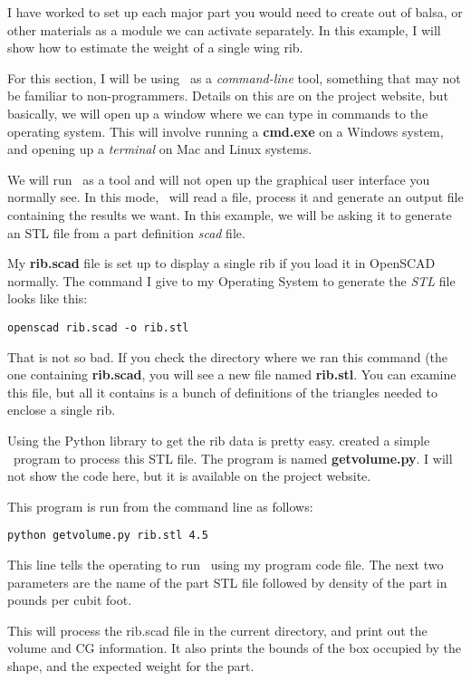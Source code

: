 I have worked to set up each major part you would need to create out of balsa,
or other materials as a module we can activate separately. In this example, I
will show how to estimate the weight of a single wing rib.

For this section, I will be using \osc\ as a {\it command-line} tool,
something that may not be familiar to non-programmers. Details on this are on
the project website, but basically, we will open up a window where we can type
in commands to the operating system. This will involve running a {\bf cmd.exe}
on a Windows system, and opening up a {\it terminal} on Mac and Linux systems.

We will run \osc\ as a tool and will not open up the graphical user
interface you normally see. In this mode, \osc\ will read a file, process it
and generate an output file containing the results we want. In this example, we
will be asking it to generate an STL file from a part definition {\it scad}
file.

My {\bf rib.scad} file is set up to display a single rib if you load it in
OpenSCAD normally. The command I give to my Operating System to generate the
{\it STL} file looks like this:

\begin{lstlisting}
openscad rib.scad -o rib.stl
\end{lstlisting}

That is not so bad. If you check the directory where we ran this command (the
one containing {\bf rib.scad}, you will see a new file named {\bf rib.stl}. You
can examine this file, but all it contains is a bunch of definitions of the
triangles needed to enclose a single rib.

Using the Python library to get the rib data is pretty easy.  created a simple
\PY\ program to process this STL file. The program is named {\bf getvolume.py}.
I will not show the code here, but it is available on the project website.

This program is run from the command line as follows:

\begin{lstlisting}
python getvolume.py rib.stl 4.5
\end{lstlisting}

This line tells the operating to run \PY\ using my program code file. The next
two parameters are the name of the part STL file followed by density of the part
in pounds per cubit foot.

This will process the rib.scad file in the current directory, and print out the
volume and CG information. It also prints the bounds of the box occupied by the
shape, and the expected weight for the part.

